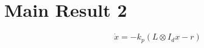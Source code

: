 \documentclass[letterpaper, 10 pt, conference]{ieeeconf}  %
\newtheorem{remark}{Remark}
\begin{document}






\section{Main Result 2}

\begin{equation}
    \dot{x} = -k_p(L \otimes I_d x - r)
\label{eq:entire_dynamic}
\end{equation}
\end{document}
